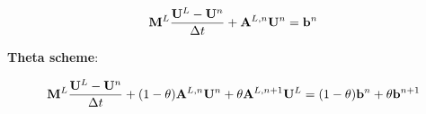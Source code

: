\begin{equation}\label{eq:low_explicit_euler}
  \lumpedmassmatrix\frac{\lowordersolution-\solutionvector^{\timeindex}}
  {\timestepsize}
  + \loworderssmatrix[\timeindex]\solutionvector^{\timeindex}
  = \ssrhs^\timeindex
\end{equation}
\begin{center}{\textbf{Theta scheme}:}\end{center}
\begin{equation}\label{eq:low_theta}
  \lumpedmassmatrix\frac{\lowordersolution-\solutionvector^\timeindex}
  {\timestepsize}
  + (1-\theta)\loworderssmatrix[\timeindex]\solutionvector^\timeindex
  + \theta\loworderssmatrix[\timeindex+1]\lowordersolution
  = (1-\theta)\ssrhs^\timeindex + \theta\ssrhs^{\timeindex+1}
\end{equation}
